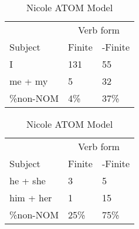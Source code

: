 \begin{table}[]
    \caption{Nicole ATOM Model}
    \begin{minipage}{0.5\textwidth}
    \centering
    \begin{tabular}{@{}lll@{}}
        \toprule
         &\multicolumn{2}{c}{Verb form}\\
         \cline{2-3}
        Subject & Finite & -Finite \\
        \midrule
        I & 131 & 55 \\
        me + my & 5 & 32 \\
        \hline
        \%non-NOM & 4\% & 37\% \\
        \bottomrule
    \end{tabular}
\end{minipage}
\begin{minipage}{0.5\textwidth}
    \centering
    \begin{tabular}{@{}lll@{}}
        \toprule
         &\multicolumn{2}{c}{Verb form}\\
         \cline{2-3}
        Subject & Finite & -Finite \\
        \midrule
        he + she & 3 & 5 \\
        him + her & 1 & 15 \\
        \hline
        \%non-NOM & 25\% & 75\% \\
        \bottomrule
    \end{tabular}
    \end{minipage}
    \begin{minipage}{0.5\textwidth}
    

\end{minipage}
\end{table}
